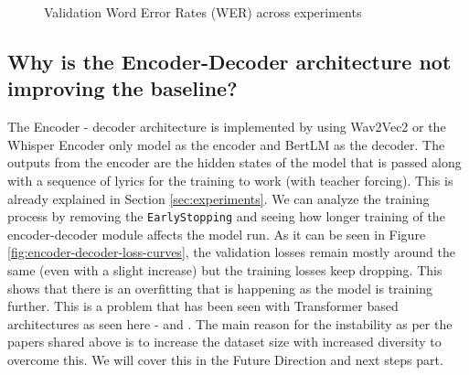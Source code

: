 \begin{figure}
    \caption{Validation Word Error Rates (WER) across experiments} \label{fig:experiment-wers}
    \end{figure}




\subsection{\textbf{  Why is the Encoder-Decoder architecture not improving the baseline?}}

The Encoder - decoder architecture is implemented by using Wav2Vec2 or the Whisper Encoder only model as the encoder and BertLM as the decoder. The outputs from the encoder are the hidden states of the model that is passed along with a sequence of lyrics for the training to work (with teacher forcing). This is already explained in Section \ref{sec:experiments}. We can analyze the training process by removing the \texttt{EarlyStopping} and seeing how longer training of the encoder-decoder module affects the model run. As it can be seen in Figure \ref{fig:encoder-decoder-loss-curves}, the validation losses remain mostly around the same (even with a slight increase) but the training losses keep dropping. This shows that there is an overfitting that is happening as the model is training further. This is a problem that has been seen with Transformer based architectures as seen here -  \cite{mosbach2020stability} and \cite{devlin2018bert}. The main reason for the instability as per the papers shared above is to increase the dataset size with increased diversity to overcome this. We will cover this in the Future Direction and next steps part.

